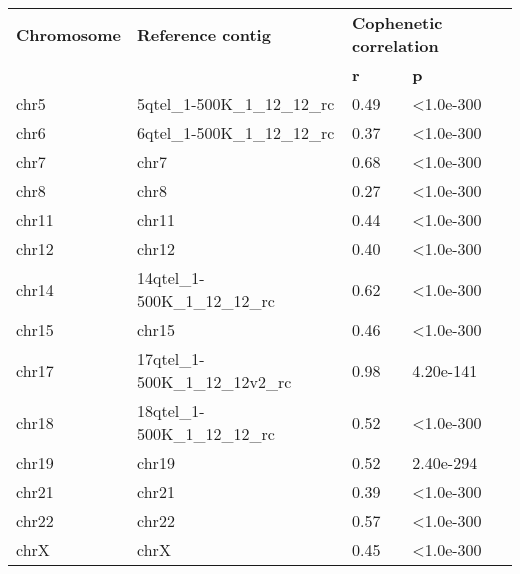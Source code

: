 \begin{samepage} \begin{table}[h!] \small \begin{tabular}{llll}
\hline
\textbf{Chromosome} & \textbf{Reference contig}       & \multicolumn{2}{l}{\textbf{Cophenetic correlation}} \\
\textbf{}           & \textbf{}                       & \textbf{r} & \textbf{p}                             \\
\hline
chr5                & 5qtel\_1-500K\_1\_12\_12\_rc    & 0.49       & <1.0e-300                              \\
chr6                & 6qtel\_1-500K\_1\_12\_12\_rc    & 0.37       & <1.0e-300                              \\
chr7                & chr7                            & 0.68       & <1.0e-300                              \\
chr8                & chr8                            & 0.27       & <1.0e-300                              \\
chr11               & chr11                           & 0.44       & <1.0e-300                              \\
chr12               & chr12                           & 0.40       & <1.0e-300                              \\
chr14               & 14qtel\_1-500K\_1\_12\_12\_rc   & 0.62       & <1.0e-300                              \\
chr15               & chr15                           & 0.46       & <1.0e-300                              \\
chr17               & 17qtel\_1-500K\_1\_12\_12v2\_rc & 0.98       & 4.20e-141                              \\
chr18               & 18qtel\_1-500K\_1\_12\_12\_rc   & 0.52       & <1.0e-300                              \\
chr19               & chr19                           & 0.52       & 2.40e-294                              \\
chr21               & chr21                           & 0.39       & <1.0e-300                              \\
chr22               & chr22                           & 0.57       & <1.0e-300                              \\
chrX                & chrX                            & 0.45       & <1.0e-300                              \\
\hline
\end{tabular}
\caption{}
\label{}
\end{table}
\end{samepage}
